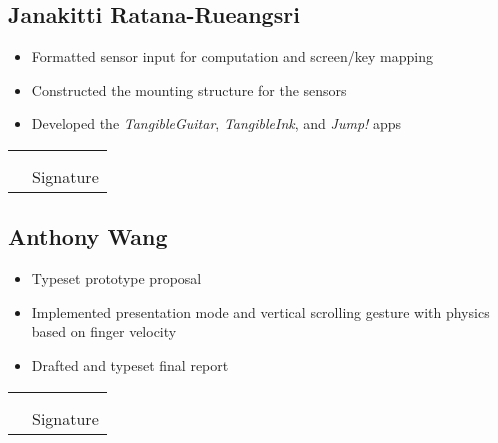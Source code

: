 \documentclass{article}
\begin{document}
\subsection{Janakitti Ratana-Rueangsri}
\begin{itemize}
    \item Formatted sensor input for computation and screen/key mapping
    \item Constructed the mounting structure for the sensors
    \item Developed the \textit{TangibleGuitar}, \textit{TangibleInk}, and \textit{Jump!} apps
\end{itemize}
\begin{tabular}{@{}p{0in}p{4in}@{}}
\\
\\
& \hrulefill \\
& Signature \\
\end{tabular}
\subsection{Anthony Wang}
\begin{itemize}
    \item Typeset prototype proposal
    \item Implemented presentation mode and vertical scrolling gesture with physics based on finger velocity
    \item Drafted and typeset final report
\end{itemize}
\begin{tabular}{@{}p{0in}p{4in}@{}}
\\
\\
& \hrulefill \\
& Signature\\
\end{tabular}
\end{document}
